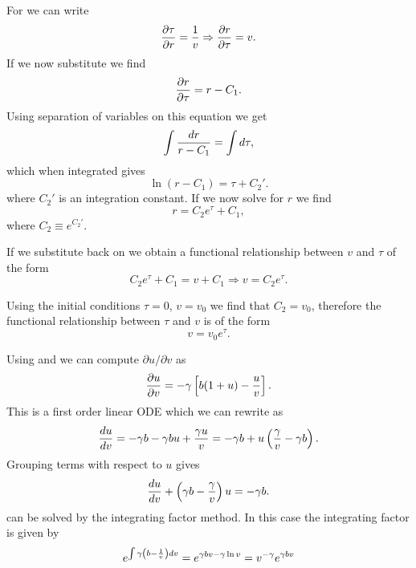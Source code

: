 For \eref[eq_ODE_3] we can write
\begin{equation}
  {\partial \tau \over \partial r} = {1 \over v} \Rightarrow
  {\partial r \over \partial \tau} = v.
\end{equation}
If we now substitute  we find
\begin{equation}
  {\partial r \over \partial \tau} = r - C_1.
\end{equation}
Using separation of variables on this equation we get
\begin{equation}
  \int {dr \over r - C_1} = \int d\tau,
\end{equation}
which when integrated gives
\begin{equation}
  \ln (r - C_1) = \tau + C_2'.
\end{equation}
where $C_2'$ is an integration constant. If we now solve for $r$ we find
\begin{equation}
  r = C_2e^{\tau} + C_1,
  \label{eq_ODE_sol_3}
\end{equation}
where $C_2 \equiv e^{C_2'}$.

If we substitute  back on  we obtain a
functional relationship between $v$ and $\tau$ of the form
\begin{equation}
  C_2 e^{\tau} + C_1 = v + C_1 \Rightarrow
  v = C_2 e^{\tau}.
\end{equation}

Using the initial conditions $\tau = 0$, $v=v_0$ we find that $C_2 = v_0$,
therefore the functional relationship between $\tau$ and $v$ is of the form
\begin{equation}
  v = v_0 e^{\tau}.
  \label{eq_v_tau_relation}
\end{equation}

Using \eref[eq_ODE_1] and \eref[eq_ODE_2] we can compute
$\partial u / \partial v$ as
\begin{equation}
  {\partial u \over \partial v} =
  - \gamma \left[ b (1 + u) - {u \over v} \right].
\end{equation}
This is a first order linear ODE which we can rewrite as
\begin{equation}
  {du \over dv} = -\gamma b
  - \gamma b u
  + {\gamma u \over v} =
  -\gamma b
  + u \left( {\gamma \over v} - \gamma b \right).
\end{equation}
Grouping terms with respect to $u$ gives
\begin{equation}
  {du \over dv} + \left( \gamma b - {\gamma \over v} \right) u = - \gamma b.
  \label{eq_dudv}
\end{equation}
\eref[eq_dudv] can be solved by the integrating factor method. In this case
the integrating factor is given by
\begin{equation}
  e^{\int \gamma \left( b - {1 \over v} \right) dv} =
  e^{\gamma b v - \gamma \ln v} = v^{-\gamma} e^{\gamma b v}
  \label{eq_dudv_integ_factor}
\end{equation}

